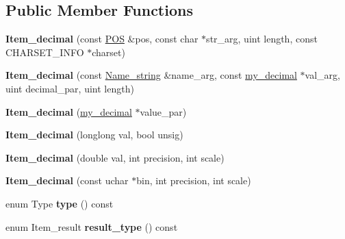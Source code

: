 \subsection*{Public Member Functions}
\begin{DoxyCompactItemize}
\item 
\mbox{\label{classItem__decimal_ac8365ce54489852ddb8269909b873864}} 
{\bfseries Item\+\_\+decimal} (const \mbox{\hyperlink{structYYLTYPE}{P\+OS}} \&pos, const char $\ast$str\+\_\+arg, uint length, const C\+H\+A\+R\+S\+E\+T\+\_\+\+I\+N\+FO $\ast$charset)
\item 
\mbox{\label{classItem__decimal_a0ec15c52181dc23c903691ba81a9f4d7}} 
{\bfseries Item\+\_\+decimal} (const \mbox{\hyperlink{className__string}{Name\+\_\+string}} \&name\+\_\+arg, const \mbox{\hyperlink{classmy__decimal}{my\+\_\+decimal}} $\ast$val\+\_\+arg, uint decimal\+\_\+par, uint length)
\item 
\mbox{\label{classItem__decimal_a85e5cec575dda2fecebab38d39440a3e}} 
{\bfseries Item\+\_\+decimal} (\mbox{\hyperlink{classmy__decimal}{my\+\_\+decimal}} $\ast$value\+\_\+par)
\item 
\mbox{\label{classItem__decimal_abf12e2a94349d1e8dee0ab84a8fe69c5}} 
{\bfseries Item\+\_\+decimal} (longlong val, bool unsig)
\item 
\mbox{\label{classItem__decimal_a8353b510c4f35ce587393c0dfc2d041b}} 
{\bfseries Item\+\_\+decimal} (double val, int precision, int scale)
\item 
\mbox{\label{classItem__decimal_a66cddb036548764cd1d953cc9022c63f}} 
{\bfseries Item\+\_\+decimal} (const uchar $\ast$bin, int precision, int scale)
\item 
\mbox{\label{classItem__decimal_a5f485dfbf3261d5bceafce3e85a0c8b3}} 
enum Type {\bfseries type} () const
\item 
\mbox{\label{classItem__decimal_a7fd724bd984b07ef991dbc5502238cd2}} 
enum Item\+\_\+result {\bfseries result\+\_\+type} () const
\item 
\mbox{\label{classItem__decimal_ae69da6b35b4c34dd923ab7039e344966}} 

\end{DoxyCompactItemize}
